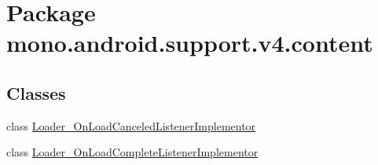 \hypertarget{namespacemono_1_1android_1_1support_1_1v4_1_1content}{
\section{Package mono.android.support.v4.content}
\label{namespacemono_1_1android_1_1support_1_1v4_1_1content}
}
\subsection*{Classes}
\begin{CompactItemize}
\item 
class \hyperlink{classmono_1_1android_1_1support_1_1v4_1_1content_1_1_loader___on_load_canceled_listener_implementor}{Loader\_\-OnLoadCanceledListenerImplementor}
\item 
class \hyperlink{classmono_1_1android_1_1support_1_1v4_1_1content_1_1_loader___on_load_complete_listener_implementor}{Loader\_\-OnLoadCompleteListenerImplementor}
\end{CompactItemize}
